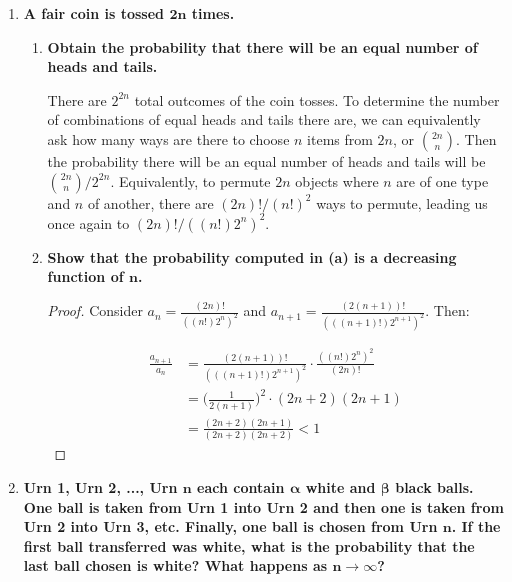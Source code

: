 \documentclass[10pt, oneside]{article}   	%
\theoremstyle{definition}
\begin{document}
\begin{enumerate}[label=3.\arabic*]
\item  \begin{tcolorbox}[
  colback=Cerulean!5!white,
  colframe=Cerulean!75!black]
\textbf{A fair coin is tossed $\bm{2n}$ times.}
\end{tcolorbox}

	\begin{enumerate}
	\item  \begin{tcolorbox}[
	  colback=Cerulean!5!white,
	  colframe=Cerulean!75!black]
	\textbf{Obtain the probability that there will be an equal number of heads and tails.}
	\end{tcolorbox}
	
	There are $2^{2n}$ total outcomes of the coin tosses. To determine the number of combinations of equal heads and tails there are, we can equivalently ask how many ways are there to choose $n$ items from $2n$, or $\binom{2n}{n}$. Then the probability there will be an equal number of heads and tails will be $\boxed{ \binom{2n}{n} / 2^{2n} }$. Equivalently, to permute $2n$ objects where $n$ are of one type and $n$ of another, there are $(2n)! / (n!)^2$ ways to permute, leading us once again to $\boxed{(2n)! / ((n!) 2^{n})^2}$.
	
	\item  \begin{tcolorbox}[
	  colback=Cerulean!5!white,
	  colframe=Cerulean!75!black]
	\textbf{Show that the probability computed in (a) is a decreasing function of $\bm{n}$.}
	\end{tcolorbox}
	
	\begin{proof}
	
	Consider $a_n = \frac{(2n)!}{((n!) 2^{n})^2}$ and $a_{n+1} = \frac{(2(n+1))!}{(((n+1)!) 2^{n+1})^2}$. Then:
	
	\begin{align*}
	\frac{a_{n+1}}{a_n} &= \frac{ (2(n+1))! }{ (((n+1)!) 2^{n+1})^2} \cdot \frac{((n!) 2^{n})^2}{(2n)!} \\
	&= \Bigg( \frac{1}{2(n+1)} \Bigg)^2 \cdot (2n+2)(2n+1) \\
	&= \frac{(2n+2)(2n+1)}{(2n+2)(2n+2)} < 1
	\end{align*}
	
	\end{proof}
	
	\end{enumerate}

\item  \begin{tcolorbox}[
  colback=Cerulean!5!white,
  colframe=Cerulean!75!black]
\textbf{Urn 1, Urn 2, ..., Urn $\bm{n}$ each contain $\bm{\alpha}$ white and $\bm{\beta}$ black balls. One ball is taken from Urn 1 into Urn 2 and then one is taken from Urn 2 into Urn 3, etc. Finally, one ball is chosen from Urn $\bm{n}$. If the first ball transferred was white, what is the probability that the last ball chosen is white? What happens as $\bm{n \rightarrow \infty}$?}
\end{tcolorbox}


\end{enumerate}
\end{document}

